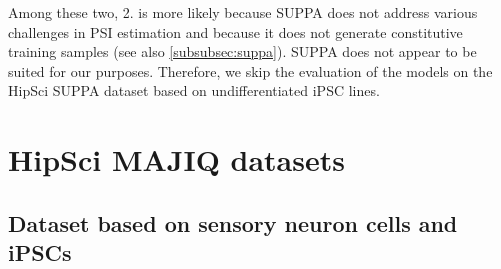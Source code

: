 Among these two, 2. is more likely because SUPPA does not address various challenges in PSI estimation and because it does not generate constitutive training samples (see also \ref{subsubsec:suppa}). SUPPA does not appear to be suited for our purposes. Therefore, we skip the evaluation of the models on the HipSci SUPPA dataset based on undifferentiated iPSC lines.





\section{HipSci MAJIQ datasets} \label{subsec:majiq}

\subsection{Dataset based on sensory neuron cells and iPSCs}\label{sec:hipsci_neuron_majiq}




